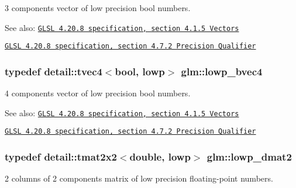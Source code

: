 3 components vector of low precision bool numbers.

\begin{Desc}
\item[See also:]\href{http://www.opengl.org/registry/doc/GLSLangSpec.4.20.8.pdf}{\tt GLSL 4.20.8 specification, section 4.1.5 Vectors} 

\href{http://www.opengl.org/registry/doc/GLSLangSpec.4.20.8.pdf}{\tt GLSL 4.20.8 specification, section 4.7.2 Precision Qualifier} \end{Desc}
\hypertarget{group__core__precision_g24c651dc8cb20779b3773428aef4f7f4}{
\subsubsection[lowp\_\-bvec4]{\setlength{\rightskip}{0pt plus 5cm}typedef detail::tvec4$<$bool, lowp$>$ {\bf glm::lowp\_\-bvec4}}}
\label{group__core__precision_g24c651dc8cb20779b3773428aef4f7f4}


4 components vector of low precision bool numbers.

\begin{Desc}
\item[See also:]\href{http://www.opengl.org/registry/doc/GLSLangSpec.4.20.8.pdf}{\tt GLSL 4.20.8 specification, section 4.1.5 Vectors} 

\href{http://www.opengl.org/registry/doc/GLSLangSpec.4.20.8.pdf}{\tt GLSL 4.20.8 specification, section 4.7.2 Precision Qualifier} \end{Desc}
\hypertarget{group__core__precision_g5e08c45dfef867e0326a1eee95060cd0}{
\subsubsection[lowp\_\-dmat2]{\setlength{\rightskip}{0pt plus 5cm}typedef detail::tmat2x2$<$double, lowp$>$ {\bf glm::lowp\_\-dmat2}}}
\label{group__core__precision_g5e08c45dfef867e0326a1eee95060cd0}


2 columns of 2 components matrix of low precision floating-point numbers.

